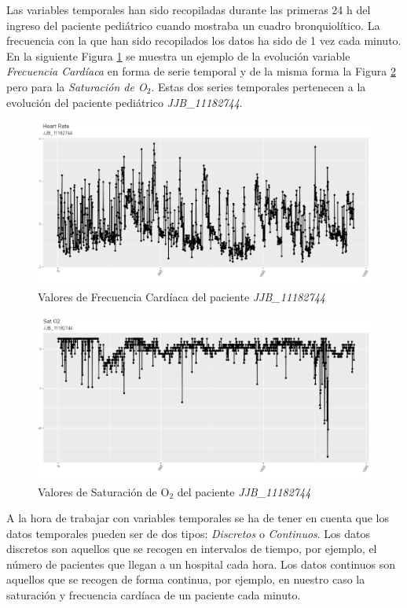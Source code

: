 Las variables temporales han sido recopiladas durante las primeras 24 h del ingreso del paciente pediátrico cuando mostraba un cuadro bronquiolítico. La frecuencia con la que han sido recopilados los datos ha sido de 1 vez cada minuto. En la siguiente Figura \ref{fig:fc-JJB} se muestra un ejemplo de la evolución  variable \textit{Frecuencia Cardíaca} en forma de serie temporal y de la misma forma la Figura \ref{fig:satO2-JJB} pero para la \textit{Saturación de O$_2$}. Estas dos series temporales pertenecen a la evolución del paciente pediátrico \textit{JJB\_11182744}.

\begin{figure}[H]
    \centering
    \includegraphics[scale=0.70]{./img/Heart-Rate-JJB.png}
    \caption{Valores de Frecuencia Cardíaca del paciente \textit{JJB\_11182744}}
    \label{fig:fc-JJB}
\end{figure}

\begin{figure}[H]
    \centering
    \includegraphics[scale=0.70]{./img/SatO2-JJB.png}
    \caption{Valores de Saturación de O$_2$ del paciente \textit{JJB\_11182744}}
    \label{fig:satO2-JJB}
\end{figure}

A la hora de trabajar con variables temporales se ha de tener en cuenta que los datos temporales pueden ser de dos tipos: \textit{Discretos} o \textit{Continuos}. Los datos discretos son aquellos que se recogen en intervalos de tiempo, por ejemplo, el número de pacientes que llegan a un hospital cada hora. Los datos continuos son aquellos que se recogen de forma continua, por ejemplo, en nuestro caso la saturación y frecuencia cardíaca de un paciente cada minuto.

